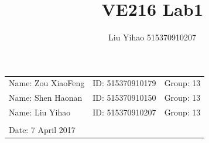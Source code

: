 \documentclass{article}
\title{VE216 Lab1}
\author{Liu Yihao 515370910207}
\date{}
\begin{document}
\vspace*{0.25cm}

\hrulefill

\thispagestyle{empty}

\begin{center}
\begin{large}
\end{large}

\hrulefill

\vspace*{5cm}
\begin{Large}
\end{Large}

\vspace{2em}

\begin{large}
\end{large}
\end{center}

\vfill

\begin{table}[h!]
\flushleft
\begin{tabular}{lll}
Name: Zou XiaoFeng \hspace*{2em}&
ID: 515370910179\hspace*{2em}
& Group: 13\\
Name: Shen Haonan \hspace*{2em}&
ID: 515370910150\hspace*{2em}
& Group: 13\\
Name: Liu Yihao \hspace*{2em}&
ID: 515370910207\hspace*{2em}
& Group: 13\\
\\

Date: 7 April 2017 

\end{tabular}
\end{table}

\hfill

\newpage
\end{document}
